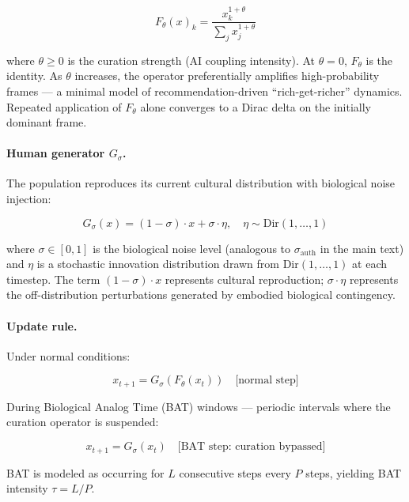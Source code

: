 \documentclass[11pt, a4paper]{article}
\theoremstyle{remark}
\begin{document}
\begin{equation}
F_\theta(x)_k = \frac{x_k^{1+\theta}}{\sum_j x_j^{1+\theta}}
\label{eq:curation}
\end{equation}

where $\theta \geq 0$ is the curation strength (AI coupling intensity). At $\theta = 0$, $F_\theta$ is the identity. As $\theta$ increases, the operator preferentially amplifies high-probability frames --- a minimal model of recommendation-driven ``rich-get-richer'' dynamics. Repeated application of $F_\theta$ alone converges to a Dirac delta on the initially dominant frame.

\paragraph{Human generator $G_\sigma$.} The population reproduces its current cultural distribution with biological noise injection:

\begin{equation}
G_\sigma(x) = (1 - \sigma) \cdot x + \sigma \cdot \eta, \quad \eta \sim \text{Dir}(1, \ldots, 1)
\label{eq:generator}
\end{equation}

where $\sigma \in [0, 1]$ is the biological noise level (analogous to $\sigma_{\text{auth}}$ in the main text) and $\eta$ is a stochastic innovation distribution drawn from $\text{Dir}(1, \ldots, 1)$ at each timestep. The term $(1 - \sigma) \cdot x$ represents cultural reproduction; $\sigma \cdot \eta$ represents the off-distribution perturbations generated by embodied biological contingency.

\paragraph{Update rule.} Under normal conditions:

\begin{equation}
x_{t+1} = G_\sigma(F_\theta(x_t)) \quad \text{[normal step]}
\end{equation}

During Biological Analog Time (BAT) windows --- periodic intervals where the curation operator is suspended:

\begin{equation}
x_{t+1} = G_\sigma(x_t) \quad \text{[BAT step: curation bypassed]}
\end{equation}

BAT is modeled as occurring for $L$ consecutive steps every $P$ steps, yielding BAT intensity $\tau = L/P$.
\end{document}
